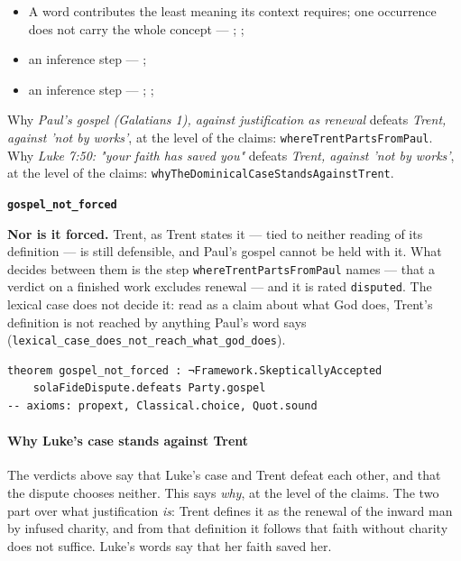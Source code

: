 \documentclass[11pt]{article}
\begin{document}
\begin{itemize}
\begin{itemize}
\item A word contributes the least meaning its context requires; one occurrence does not carry the whole concept --- \cite{silva-biblical-words-1994}; \cite{joos-semantic-axiom-1972}; \cite{barr-semantics-2004}
\item an inference step --- \cite[ad loc. Rom 4:6]{moo-romans-1996}; \cite[s.v. λογίζομαι]{bauer-danker-lexicon-2000}
\item an inference step --- \cite{silva-biblical-words-1994}; \cite[p. 80]{moo-romans-1996}; \cite{barr-semantics-2004}
\end{itemize}
\end{itemize}
\noindent Why \emph{Paul's gospel (Galatians 1), against justification as renewal} defeats \emph{Trent, against 'not by works'}, at the level of the claims: \texttt{where\allowbreak{}Trent\allowbreak{}Parts\allowbreak{}From\allowbreak{}Paul}.
\noindent Why \emph{Luke 7:50: "your faith has saved you"} defeats \emph{Trent, against 'not by works'}, at the level of the claims: \texttt{why\allowbreak{}The\allowbreak{}Dominical\allowbreak{}Case\allowbreak{}Stands\allowbreak{}Against\allowbreak{}Trent}.
\par\medskip\noindent\textbf{\texttt{gospel\_\allowbreak{}not\_\allowbreak{}forced}}\par\nobreak\noindent
\textbf{Nor is it forced.} Trent, as Trent states it — tied to neither reading of its definition — is still defensible, and Paul's gospel cannot be held with it. What decides between them is the step \texttt{where\allowbreak{}Trent\allowbreak{}Parts\allowbreak{}From\allowbreak{}Paul} names — that a verdict on a finished work excludes renewal — and it is rated \texttt{disputed}. The lexical case does not decide it: read as a claim about what God does, Trent's definition is not reached by anything Paul's word says (\texttt{lexical\_\allowbreak{}case\_\allowbreak{}does\_\allowbreak{}not\_\allowbreak{}reach\_\allowbreak{}what\_\allowbreak{}god\_\allowbreak{}does}).

{\small\begin{verbatim}
theorem gospel_not_forced : ¬Framework.SkepticallyAccepted
    solaFideDispute.defeats Party.gospel
-- axioms: propext, Classical.choice, Quot.sound
\end{verbatim}}
\paragraph*{Why Luke's case stands against Trent}
\leavevmode\par
The verdicts above say that Luke's case and Trent defeat each other, and that the dispute chooses neither. This says \emph{why}, at the level of the claims. The two part over what justification \emph{is}: Trent defines it as the renewal of the inward man by infused charity, and from that definition it follows that faith without charity does not suffice. Luke's words say that her faith saved her.
\end{document}

